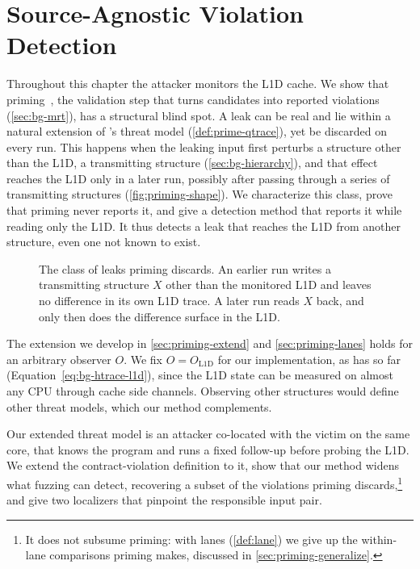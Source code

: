 \chapter{Source-Agnostic Violation Detection}
\label{chap:priming}

Throughout this chapter the attacker monitors the L1D cache. We show that priming~\cite{revizor},
the validation step that turns candidates into reported violations (\autoref{sec:bg-mrt}), has a
structural blind spot. A leak can be real and lie within a natural extension of \revizor{}'s threat
model (\autoref{def:prime-qtrace}), yet be discarded on every run. This happens when the leaking
input first perturbs a structure other than the L1D, a transmitting structure
(\autoref{sec:bg-hierarchy}), and that effect reaches the L1D only in a later run, possibly after
passing through a series of transmitting structures (\autoref{fig:priming-shape}). We characterize
this class, prove that priming never reports it, and give a detection method that reports it while
reading only the L1D. It thus detects a leak that reaches the L1D from another structure, even one
not known to exist.

\begin{figure}[t]
\centering
\fitwidth{}
\caption{The class of leaks priming discards. An earlier run writes a transmitting structure $X$
other than the monitored L1D and leaves no difference in its own L1D trace. A later run reads $X$
back, and only then does the difference surface in the L1D.}
\label{fig:priming-shape}
\end{figure}

The extension we develop in \autoref{sec:priming-extend} and \autoref{sec:priming-lanes} holds for
an arbitrary observer $O$. We fix $O=O_{\mathrm{L1D}}$ for our implementation, as \revizor{} has so
far (Equation~\eqref{eq:bg-htrace-l1d}), since the L1D state can be measured on almost any CPU through cache side
channels. Observing other structures would define other threat models, which our method complements.

Our extended threat model is an attacker co-located with the victim on the same core, that knows
the program and runs a fixed follow-up before probing the L1D. We extend the contract-violation
definition to it, show that our method widens what fuzzing can detect, recovering a subset of the
violations priming discards,\footnote{It does not subsume priming: with lanes (\autoref{def:lane})
we give up the within-lane comparisons priming makes, discussed in \autoref{sec:priming-generalize}.}
and give two localizers that pinpoint the responsible input pair.

